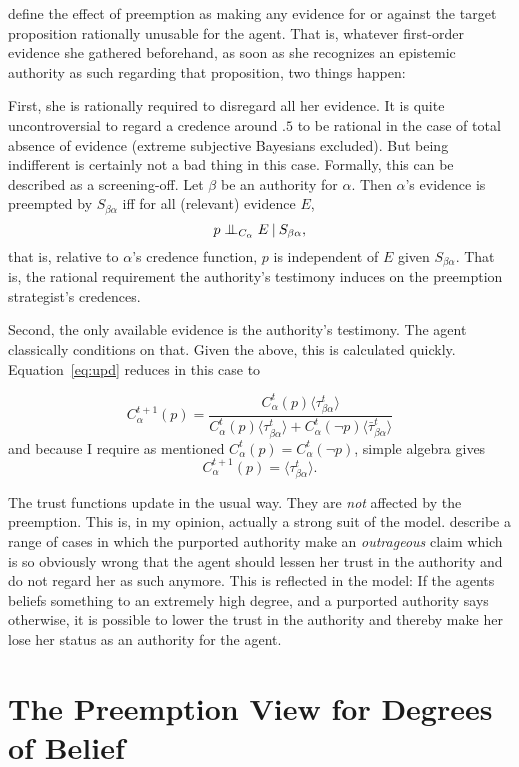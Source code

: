 \documentclass[11pt, a4paper]{scrartcl}
\newcommand{\given}[1][]{\:#1\vert\:}
\newcommand{\CI}{\mathrel{\perp\mspace{-10mu}\perp}}
\renewcommand{\i}[1]{\emph{#1}}
\renewcommand{\a}{\alpha}
\begin{document}
\textcite[p.12]{Constantin2017} define the effect of preemption as making any evidence for or against the target proposition rationally unusable for the agent. That is, whatever first-order evidence she gathered beforehand, as soon as she recognizes an epistemic authority as such regarding that proposition, two things happen: 

First, she is rationally required to disregard all her evidence. It is quite uncontroversial to regard a credence around $.5$ to be rational in the case of total absence of evidence (extreme subjective Bayesians excluded). But being indifferent is certainly not a bad thing in this case. Formally, this can be described as a screening-off. Let $\beta$ be an authority for $\alpha$. Then $\a$'s evidence is preempted by $S_{\beta\a}$ iff for all (relevant) evidence $E$, 
\[ 
    p \CI_{C_\a} E \given S_{\beta\a}, 
\]
that is, relative to $\a$'s credence function, $p$ is independent of $E$ given $S_{\beta\a}$. That is, the rational requirement the authority's testimony induces on the preemption strategist's credences.

Second, the only available evidence is the authority's testimony. The agent classically conditions on that. Given the above, this is calculated quickly. Equation~\ref{eq:upd} reduces in this case to 

\[
    C^{t+1}_\a (p) = \frac{C^t_\a(p) \langle \tau^t_{\beta\a} \rangle}
    {C^t_\a(p) \langle \tau^t_{\beta\a} \rangle + C^t_\a(\neg p) \langle \bar{\tau}^t_{\beta\a} \rangle}
\]
and because I require as mentioned $C^t_\a(p) = C^t_\a( \neg p)$, simple algebra gives 
\[
    C^{t+1}_\a (p) = \langle \tau^t_{\beta\a} \rangle.
\]

The trust functions update in the usual way. They are \i{not} affected by the preemption. This is, in my opinion, actually a strong suit of the model. \textcite[p. XX]{Constantin2017} describe a range of cases in which the purported authority make an  \i{outrageous} claim which is so obviously wrong that the agent should lessen her trust in the authority and do not regard her as such anymore. This is reflected in the model: If the agents beliefs something to an extremely high degree, and a purported authority says otherwise, it is possible to lower the trust in the authority and thereby make her lose her status as an authority for the agent. 


\section{The Preemption View for Degrees of Belief}
\end{document}
